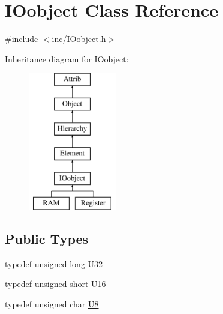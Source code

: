 \hypertarget{classIOobject}{}\section{I\+Oobject Class Reference}
\label{classIOobject}


{\ttfamily \#include $<$inc/\+I\+Oobject.\+h$>$}

Inheritance diagram for I\+Oobject\+:\begin{figure}[H]
\begin{center}
\leavevmode
\includegraphics[height=6.000000cm]{classIOobject}
\end{center}
\end{figure}
\subsection*{Public Types}
\begin{DoxyCompactItemize}
\item 
typedef unsigned long \hyperlink{classIOobject_ad5bc21e44080074fe1068dc83861a090}{U32}
\item 
typedef unsigned short \hyperlink{classIOobject_a260583f7e496b1979cb75adc9bbb7fc4}{U16}
\item 
typedef unsigned char \hyperlink{classIOobject_a14ca3894cb3b023d2a0b2d088fddfc90}{U8}
\end{DoxyCompactItemize}
